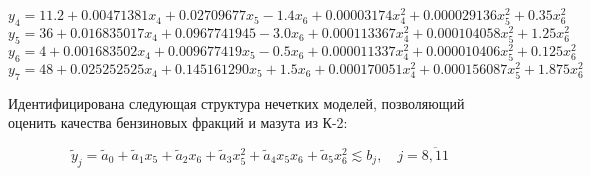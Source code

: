 \begin{equation}
y_{4} = 11.2 + 0.00471381x_{4} + 0.02709677x_{5} - 1.4x_{6} + 0.00003174x_{4}^{2} + 0.000029136x_{5}^{2} + 0.35x_{6}^{2}
\end{equation}
\begin{equation}
y_{5} = 36 + 0.016835017x_{4} + 0.0967741945 - 3.0x_{6} + 0.000113367x_{4}^{2} + 0.000104058x_{5}^{2} + 1.25x_{6}^{2}
\end{equation}
\begin{equation}
y_{6} = 4 + 0.001683502x_{4} + 0.009677419x_{5} - 0.5x_{6} + 0.000011337x_{4}^{2} + 0.000010406x_{5}^{2} + 0.125x_{6}^{2}
\end{equation}
\begin{equation}
y_{7} = 48 + 0.025252525x_{4} + 0.145161290x_{5} + 1.5x_{6} + 0.000170051x_{4}^{2} + 0.000156087x_{5}^{2} + 1.875x_{6}^{2}
\end{equation}

Идентифицирована следующая структура нечетких моделей, позволяющий
оценить качества бензиновых фракций и мазута из К-2:

\begin{equation}
{\widetilde{y}}_{j} = {\widetilde{a}}_{0} + {\widetilde{a}}_{1}x_{5} + {\widetilde{a}}_{2}x_{6} + {\widetilde{a}}_{3}x_{5}^{2} + {\widetilde{a}}_{4}x_{5}x_{6} + {\widetilde{a}}_{5}x_{6}^{2} \lesssim b_{j}, \quad j = \overline{8,11}
\end{equation}

